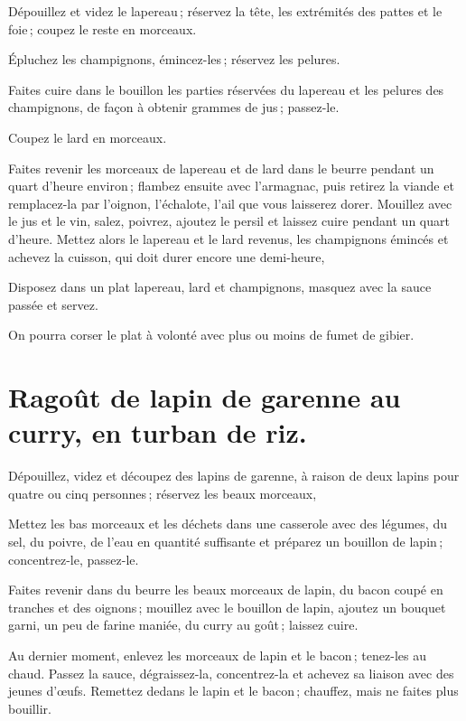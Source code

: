 Dépouillez et videz le lapereau ; réservez la tête, les extrémités des pattes
et le foie ; coupez le reste en morceaux.

Épluchez les champignons, émincez-les ; réservez les pelures.

Faites cuire dans le bouillon les parties réservées du lapereau et les pelures
des champignons, de façon à obtenir {\mmm} grammes de jus ; passez-le.

Coupez le lard en morceaux.

Faites revenir les morceaux de lapereau et de lard dans le beurre pendant un
quart d'heure environ ; flambez ensuite avec l'armagnac, puis retirez la viande
et remplacez-la par l'oignon, l'échalote, l'ail que vous laisserez dorer.
Mouillez avec le jus et le vin, salez, poivrez, ajoutez le persil et laissez
cuire pendant un quart d'heure. Mettez alors le lapereau et le lard revenus,
les champignons émincés et achevez la cuisson, qui doit durer encore une
demi-heure,

Disposez dans un plat lapereau, lard et champignons, masquez avec la sauce
passée et servez.

\medskip

On pourra corser le plat à volonté avec plus ou moins de fumet de gibier.

\section*{\centering Ragoût de lapin de garenne au curry, en turban de riz.}
{}

Dépouillez, videz et découpez des lapins de garenne, à raison de deux lapins
pour quatre ou cinq personnes ; réservez les beaux morceaux,

Mettez les bas morceaux et les déchets dans une casserole avec des légumes, du
sel, du poivre, de l'eau en quantité suffisante et préparez un bouillon de
lapin ; concentrez-le, passez-le.

Faites revenir dans du beurre les beaux morceaux de lapin, du bacon coupé en
tranches et des oignons ; mouillez avec le bouillon de lapin, ajoutez un
bouquet garni, un peu de farine maniée, du curry au goût ; laissez cuire.

Au dernier moment, enlevez les morceaux de lapin et le bacon ; tenez-les au
chaud. Passez la sauce, dégraissez-la, concentrez-la et achevez sa liaison avec
des jeunes d'œufs. Remettez dedans le lapin et le bacon ; chauffez, mais ne
faites plus bouillir.

